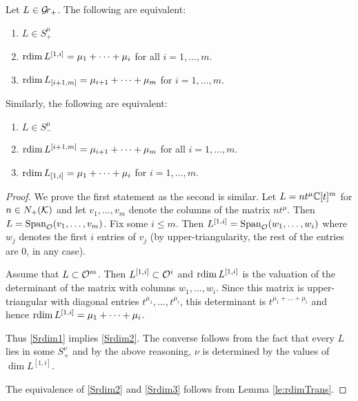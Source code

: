 \documentclass[draft]{article} %
\begin{document}
\begin{lemma} \label{le:Srdim}
    Let $ L \in \mathcal{G}\!r_+$.  The following are equivalent:
    \begin{enumerate}
        \item $ L \in S_+^\mu$ \label{Srdim1}
        \item $ \operatorname{rdim} L^{[1,i]} = \mu_1 + \dots + \mu_i$ for all $ i = 1, \dots, m $. \label{Srdim2} %
        \item $ \operatorname{rdim} L_{[i+1,m]} = \mu_{i+1} + \dots + \mu_m$ for $ i  = 1, \dots, m$. \label{Srdim3} %
    \end{enumerate}
    Similarly, the following are equivalent:
        \begin{enumerate}[label=\arabic*'.]
        \item $ L \in S_-^\mu$
        \item $ \operatorname{rdim} L^{[i+1,m]} = \mu_{i+1} + \dots + \mu_m$ for all $ i = 1, \dots, m $.
        \item $ \operatorname{rdim} L_{[1,i]} = \mu_{1} + \dots + \mu_i$ for $ i  = 1, \dots, m$.
    \end{enumerate}
\end{lemma}

\begin{proof}
We prove the first statement as the second is similar.  Let $ L = n t^\mu \mathbb C[t]^m$ for $ n \in N_+(\mathcal K)$ and let $ v_1, \dots, v_m $ denote the columns of the matrix $ nt^\mu$.  Then $ L = \operatorname{Span}_{\mathcal O}(v_1, \dots, v_m)$.  Fix some $ i \le m$.  Then $ L^{[1,i]} = \operatorname{Span}_{\mathcal O}(w_1, \dots, w_i) $ where $ w_j $ denotes the first $ i $ entries of $ v_j $ (by upper-triangularity, the rest of the entries are 0, in any case).  

Assume that $L \subset \mathcal O^m$.  Then $ L^{[1,i]} \subset \mathcal O^i$ and $ \operatorname{rdim} L^{[1,i]} $ is the valuation of the determinant of the matrix with columns $ w_1, \dots, w_i$.  Since this matrix is upper-triangular with diagonal entries $ t^{\mu_1}, \dots, t^{\mu_i}$, this determinant is $ t^{\mu_1 + \dots + \mu_i} $ and hence $ \operatorname{rdim} L^{[1,i]} = \mu_1 + \dots + \mu_i$.   

Thus \ref{Srdim1} implies \ref{Srdim2}.  The converse follows from the fact that every $ L$ lies in some $ S_+^\nu$ and by the above reasoning, $ \nu$ is determined by the values of $ \dim L^{[1,i]}$.

The equivalence of \ref{Srdim2} and \ref{Srdim3} follows from Lemma \ref{le:rdimTrans}.
\end{proof}
\end{document}
